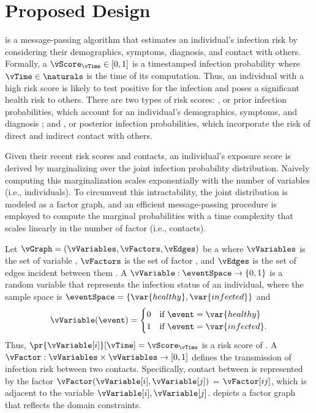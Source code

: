 \chapter{Proposed Design}\label{ch:proposed-design}

 is a message-passing algorithm that estimates an individual's infection risk by considering their demographics, symptoms, diagnosis, and contact with others. Formally, a  $\vScore_\vTime \in [0, 1]$ is a timestamped infection probability where $\vTime \in \naturals$ is the time of its computation. Thus, an individual with a high risk score is likely to test positive for the infection and poses a significant health risk to others. There are two types of risk scores: , or prior infection probabilities, which account for an individual's demographics, symptoms, and diagnosis \citep{Briers2020, Menni2020}; and , or posterior infection probabilities, which incorporate the risk of direct and indirect contact with others.

Given their recent risk scores and contacts, an individual's exposure score is derived by marginalizing over the joint infection probability distribution. Naively computing this marginalization scales exponentially with the number of variables (i.e., individuals). To circumvent this intractability, the joint distribution is modeled as a factor graph, and an efficient message-passing procedure is employed to compute the marginal probabilities with a time complexity that scales linearly in the number of factor \verticesName (i.e., contacts).

Let $\vGraph = (\vVariables, \vFactors, \vEdges)$ be a  where $\vVariables$ is the set of variable \verticesName, $\vFactors$ is the set of factor \verticesName, and $\vEdges$ is the set of edges incident between them \citep{Kschischang2001}. A  $\vVariable: \eventSpace \rightarrow \{0, 1\} $ is a random variable that represents the infection status of an individual, where the sample space is $\eventSpace = \{\var{healthy}, \var{infected}\}$ and
\begin{equation*}
  \vVariable(\event) =
    \begin{cases}
      0 & \text{if } \event = \var{healthy} \\
      1 & \text{if } \event = \var{infected}.
    \end{cases}
\end{equation*}
Thus, $\pr{\vVariable[i]}[\vTime] = \vScore_\vTime$ is a risk score of . A  $\vFactor: \vVariables \times \vVariables \rightarrow [0, 1]$ defines the transmission of infection risk between two contacts. Specifically, contact between  is represented by the factor \vertexName $\vFactor(\vVariable[i], \vVariable[j])$ = $\vFactor[ij]$, which is adjacent to the variable \verticesName $\vVariable[i], \vVariable[j]$.  depicts a factor graph that reflects the domain constraints.

